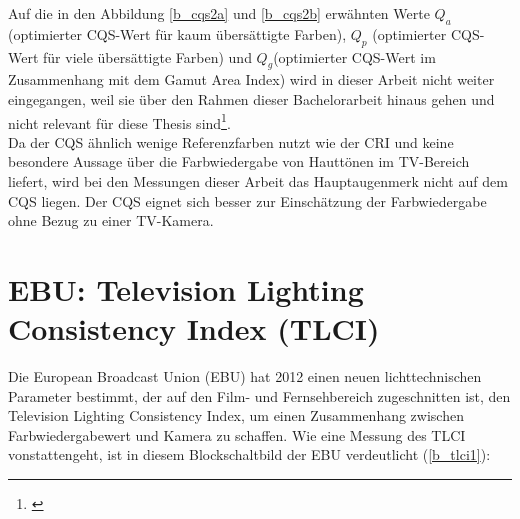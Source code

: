 \noindent Auf die in den Abbildung \ref{b_cqs2a} und \ref{b_cqs2b} erwähnten Werte $Q_{a}$ (optimierter CQS-Wert für kaum übersättigte Farben), $Q_{p}$ (optimierter CQS-Wert für viele übersättigte Farben) und $Q_{g}$(optimierter CQS-Wert im Zusammenhang mit dem Gamut Area Index) wird in dieser Arbeit nicht weiter eingegangen, weil sie über den Rahmen dieser Bachelorarbeit hinaus gehen und nicht relevant für diese Thesis sind\footnote{\cite[60-62]{khanh}}. \\
Da der CQS ähnlich wenige Referenzfarben nutzt wie der CRI und keine besondere Aussage über die Farbwiedergabe von Hauttönen im TV-Bereich liefert, wird bei den Messungen dieser Arbeit das Hauptaugenmerk nicht auf dem CQS liegen. Der CQS eignet sich besser zur Einschätzung der Farbwiedergabe ohne Bezug zu einer TV-Kamera. 


\newpage 
\section{EBU: Television Lighting Consistency Index (TLCI)} \label{sec_tlci}
Die European Broadcast Union (EBU) hat 2012 einen neuen lichttechnischen Parameter bestimmt, der auf den Film- und Fernsehbereich zugeschnitten ist, den Television Lighting Consistency Index, um einen Zusammenhang zwischen Farbwiedergabewert und Kamera zu schaffen.
Wie eine Messung des TLCI vonstattengeht, ist in diesem Blockschaltbild der EBU verdeutlicht (\ref{b_tlci1}):

